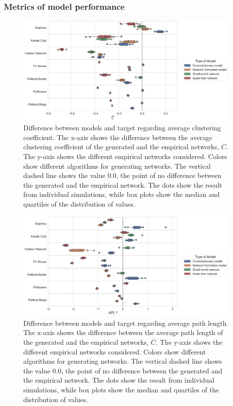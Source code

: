 \documentclass[11pt]{article}
\begin{document}
\subsubsection{Metrics of model performance}
\begin{figure}[H]
    \centering
    \includegraphics[width=.9\linewidth]{../plots/overall/Model_Evaluation_Average_Clustering.png}
  \caption{Difference between models and target regarding average clustering coefficient. The x-axis shows the difference between the average clustering coefficient of the generated and the empirical networks, $\overline{C}$. The y-axis shows the different empirical networks considered. Colors show different algorithms for generating networks. The vertical dashed line shows the value 0.0, the point of no difference between the generated and the empirical network. The dots show the result from individual simulations, while box plots show the median and quartiles of the distribution of values.}
  \label{appendix:eval_clustering}
\end{figure}

\begin{figure}[H]
    \centering
    \includegraphics[width=.9\linewidth]{../plots/overall/Model_Evaluation_APL.png}
  \caption{Difference between models and target regarding average path length. The x-axis shows the difference between the average path length of the generated and the empirical networks, $\overline{C}$. The y-axis shows the different empirical networks considered. Colors show different algorithms for generating networks. The vertical dashed line shows the value 0.0, the point of no difference between the generated and the empirical network. The dots show the result from individual simulations, while box plots show the median and quartiles of the distribution of values.}
  \label{appendix:eval_path}
\end{figure}
\end{document}
